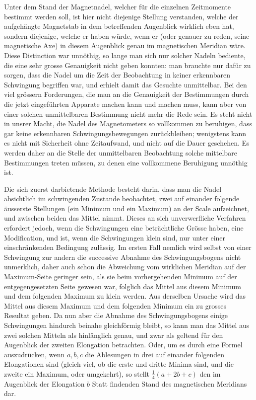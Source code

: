 Unter dem Stand der Magnetnadel, welcher für die einzelnen Zeitmomente bestimmt werden soll, ist hier nicht diejenige Stellung verstanden, welche der aufgehängte Magnetstab in dem betreffenden Augenblick wirklich eben hat, sondern diejenige, welche er haben würde, wenn er (oder genauer zu reden, seine magnetische Axe) in diesem Augenblick genau im magnetischen Meridian wäre. Diese Distinction war unnöthig, so lange man sich nur solcher Nadeln bediente, die eine sehr grosse Genauigkeit nicht geben konnten: man brauchte nur dafür zu sorgen, dass die Nadel um die Zeit der Beobachtung in keiner erkennbaren Schwingung begriffen war, und erhielt damit das Gesuchte unmittelbar. Bei den viel grössern Forderungen, die man an die Genauigkeit der Bestimmungen durch die jetzt eingeführten Apparate machen kann und machen muss, kann aber von einer solchen unmittelbaren Bestimmung nicht mehr die Rede sein. Es steht nicht in unsrer Macht, die Nadel des Magnetometers so vollkommen zu beruhigen, dass gar keine erkennbaren Schwingungsbewegungen zurückbleiben; wenigstens kann es nicht mit Sicherheit ohne Zeitaufwand, und nicht auf die Dauer geschehen. Es werden daher an die Stelle der unmittelbaren Beobachtung solche mittelbare Bestimmungen treten müssen, zu denen eine vollkommene Beruhigung unnöthig ist.

Die sich zuerst darbietende Methode besteht darin, dass man die Nadel absichtlich im schwingenden Zustande beobachtet, zwei auf einander folgende äusserste Stellungen (ein Minimum und ein Maximum) an der Scale aufzeichnet, und zwischen beiden das Mittel nimmt. Dieses an sich unverwerfliche Verfahren erfordert jedoch, wenn die Schwingungen eine beträchtliche Grösse haben, eine Modification, und ist, wenn die Schwingungen klein sind, nur unter einer einschränkenden Bedingung zulässig. Im ersten Fall nemlich wird selbst von einer Schwingung zur andern die successive Abnahme des Schwingungsbogens nicht unmerklich, daher auch schon die Abweichung vom wirklichen Meridian auf der Maximum-Seite geringer sein, als sie beim vorhergehenden Minimum auf der entgegengesetzten Seite gewesen war, folglich das Mittel aus diesem Minimum und dem folgenden Maximum zu klein werden. Aus derselben Ursache wird das Mittel aus diesem Maximum und dem folgenden Minimum ein zu grosses Resultat geben. Da nun aber die Abnahme des Schwingungsbogens einige Schwingungen hindurch beinahe gleichförmig bleibt, so kann man das Mittel aus zwei solchen Mitteln als hinlänglich genau, und zwar als geltend für den Augenblick der zweiten Elongation betrachten. Oder, um es durch eine Formel auszudrücken, wenn $a,b,c$ die Ablesungen in drei auf einander folgenden Elongationen sind (gleich viel, ob die erste und dritte Minima sind, und die zweite ein Maximum, oder umgekehrt), so stellt $\tfrac14(a+2b+c)$ den im Augenblick der Elongation $b$ Statt findenden Stand des magnetischen Meridians dar.

